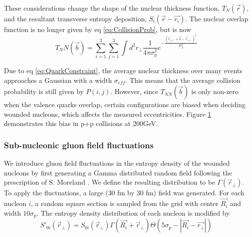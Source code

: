 \documentclass[preprint,showpacs,amsfonts,aps,prl,nofootinbib,floatfix]{revtex4}
\begin{document}
These considerations change the shape of the nuclear thickness function, $T_N(\vec{r})$, and the resultant transverse entropy deposition, $S_i(\vec{r}-\vec{r_i})$. The nuclear overlap function is no longer given by eq \ref{eq:CollisionProb}, but is now
\begin{equation}
	T_NN(\vec{b}) = \sum_{i=1}^{3}\sum_{j=1}^{3}\int{d^2r_\perp \frac{1}{4 \pi \sigma_g^2} e^{-\frac{(\vec{r}_{j\perp}+\vec{b}-\vec{r}_{i\perp})^2}{4 \sigma_g^2}}}
\end{equation}

Due to eq \ref{eq:QuarkConstraint}, the average nuclear thickness over many events approaches a Gaussian with a width $\sigma_{eff}$. This means that the average collision probability is still given by $P(i,j)$. However, since $T_{NN}(\vec{b})$ is only non-zero when the valence quarks overlap, certain configurations are biased when deciding wounded nucleons, which affects the measured eccentricities. Figure \ref{fig:CollisionComaprison} demonstrates this bias in p+p collisions at 200GeV.

\begin{figure}
	\label{fig:CollisionComaprison}
\end{figure}


\subsubsection{Sub-nucleonic gluon field fluctuations}
\label{sec2b2}
We introduce gluon field fluctuations in the entropy density of the wounded nucleons by first generating a Gamma distributed random field following the prescription of S. Moreland \cite{Moreland:2012qw}. We define the resulting distribution to be $\Gamma(\vec{r}_\perp)$. To apply the fluctuations, a large (30 fm by 30 fm) field was generated. For each nucleon $i$, a random square section is sampled from the grid with center $\vec{R_i}$ and width $10\sigma_p$.  The entropy density distribution of each nucleon is modified by 
\begin{equation}
	S'_{0i}(\vec{r}_\perp) = S_{0i}(\vec{r}_\perp) \Gamma(\vec{R_i} + \vec{r}_\perp) \Theta(5\sigma_p - |{\vec{R_i}-\vec{r_\perp}}|)
\end{equation}
\end{document}
